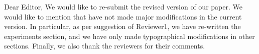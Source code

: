 Dear Editor,
We would like to re-submit the revised version of our paper. We would like to mention that have not made major modifications in the current version. 
In particular, as per suggestion of Reviewer1, we have re-written the experiments section, and we have only made typographical modifications in other sections. Finally, we also thank the reviewers for their comments. 

